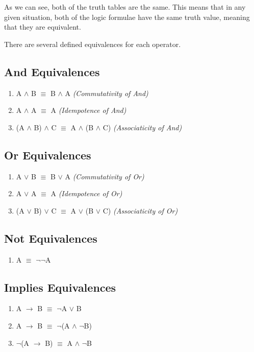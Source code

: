 \documentclass{report}
\begin{document}
As we can see, both of the truth tables are the same. This means that in any given
situation, both of the logic formulae have the same truth value, meaning that they
are equivalent.

There are several defined equivalences for each operator.

\subsection{And Equivalences}
\begin{enumerate}

  \item A $\land$ B $\equiv$ B $\land$ A \emph{(Commutativity of And)}
  \item A $\land$ A $\equiv$ A \emph{(Idempotence of And)}
  \item (A $\land$ B) $\land$ C $\equiv$ A $\land$ (B $\land$ C) \emph{(Associaticity of And)}

\end{enumerate}

\subsection{Or Equivalences}
\begin{enumerate}

  \item A $\lor$ B $\equiv$ B $\lor$ A \emph{(Commutativity of Or)}
	\item A $\lor$ A $\equiv$ A \emph{(Idempotence of Or)}
  \item (A $\lor$ B) $\lor$ C $\equiv$ A $\lor$ (B $\lor$ C) \emph{(Associaticity of Or)}

\end{enumerate}

\subsection{Not Equivalences}
\begin{enumerate}

  \item A $\equiv$ $\neg$$\neg$A

\end{enumerate}

\subsection{Implies Equivalences}
\begin{enumerate}

  \item A $\to$ B $\equiv$ $\neg$A $\lor$ B
  \item A $\to$ B $\equiv$ $\neg$(A $\land$ $\neg$B)
  \item $\neg$(A $\to$ B) $\equiv$ A $\land$ $\neg$B

\end{enumerate}
\end{document}
